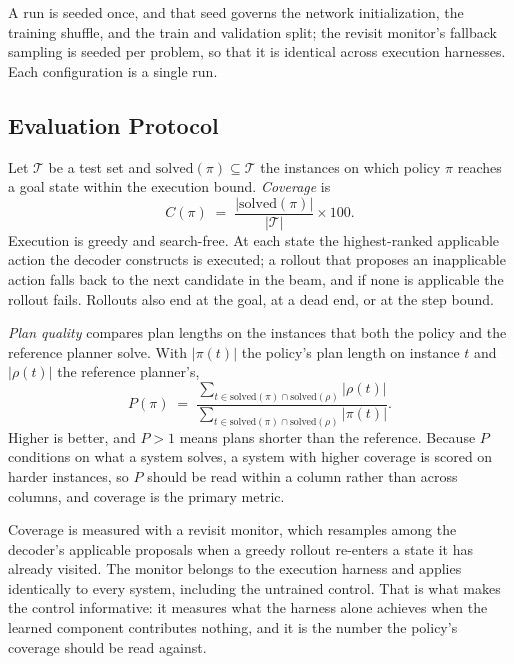 \documentclass{article} %
\begin{document}
A run is seeded once, and that seed governs the network initialization, the
training shuffle, and the train and validation split; the revisit monitor's
fallback sampling is seeded per problem, so that it is identical across
execution harnesses. Each configuration is a single run.

\subsection{Evaluation Protocol}
\label{app:metrics}

Let $\mathcal{T}$ be a test set and $\mathrm{solved}(\pi) \subseteq
\mathcal{T}$ the instances on which policy $\pi$ reaches a goal state within
the execution bound. \emph{Coverage} is
\begin{equation*}
C(\pi) \;=\; \frac{|\mathrm{solved}(\pi)|}{|\mathcal{T}|} \times 100 .
\end{equation*}
Execution is greedy and search-free. At each state the highest-ranked
applicable action the decoder constructs is executed; a rollout that proposes
an inapplicable action falls back to the next candidate in the beam, and if
none is applicable the rollout fails. Rollouts also end at the goal, at a
dead end, or at the step bound.

\emph{Plan quality} compares plan lengths on the instances that both the
policy and the reference planner solve. With $|\pi(t)|$ the policy's plan
length on instance $t$ and $|\rho(t)|$ the reference planner's,
\begin{equation*}
P(\pi) \;=\; \frac{\sum_{t \in \mathrm{solved}(\pi) \cap \mathrm{solved}(\rho)} |\rho(t)|}
                 {\sum_{t \in \mathrm{solved}(\pi) \cap \mathrm{solved}(\rho)} |\pi(t)|} .
\end{equation*}
Higher is better, and $P > 1$ means plans shorter than the reference. Because
$P$ conditions on what a system solves, a system with higher coverage is
scored on harder instances, so $P$ should be read within a column rather than
across columns, and coverage is the primary metric.

Coverage is measured with a revisit monitor, which resamples among the
decoder's applicable proposals when a greedy rollout re-enters a state it has
already visited. The monitor belongs to the execution harness and applies
identically to every system, including the untrained control. That is what
makes the control informative: it measures what the harness alone achieves
when the learned component contributes nothing, and it is the number the
policy's coverage should be read against.
\end{document}
